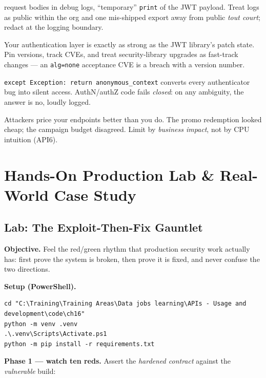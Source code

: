 \begin{description}[style=nextline, itemsep=0.5em]
        request bodies in debug logs, ``temporary'' \texttt{print} of the
        JWT payload. Treat logs as public within the org and one mis-shipped
        export away from public \emph{tout court}; redact at the logging
        boundary.
  \item[Unversioned security dependencies.] Your authentication layer is
        exactly as strong as the JWT library's patch state. Pin versions,
        track CVEs, and treat security-library upgrades as fast-track
        changes --- an \texttt{alg=none} acceptance CVE is a breach with a
        version number.
  \item[Fail-open error handling.] \texttt{except Exception: return
        anonymous\_context} converts every authenticator bug into silent
        access. AuthN/authZ code fails \emph{closed}: on any ambiguity, the
        answer is no, loudly logged.
  \item[Rate limits only on ``expensive-looking'' routes.] Attackers price
        your endpoints better than you do. The promo redemption looked
        cheap; the campaign budget disagreed. Limit by \emph{business
        impact}, not by CPU intuition (API6).
\end{description}

\section{Hands-On Production Lab \& Real-World Case Study}
\label{sec:ch16-lab}

\subsection{Lab: The Exploit-Then-Fix Gauntlet}

\textbf{Objective.} Feel the red/green rhythm that production security work
actually has: first prove the system is broken, then prove it is fixed, and
never confuse the two directions.

\textbf{Setup (PowerShell).}

\begin{verbatim}
cd "C:\Training\Training Areas\Data jobs learning\APIs - Usage and development\code\ch16"
python -m venv .venv
.\.venv\Scripts\Activate.ps1
python -m pip install -r requirements.txt
\end{verbatim}

\textbf{Phase 1 --- watch ten reds.} Assert the \emph{hardened contract}
against the \emph{vulnerable} build:

